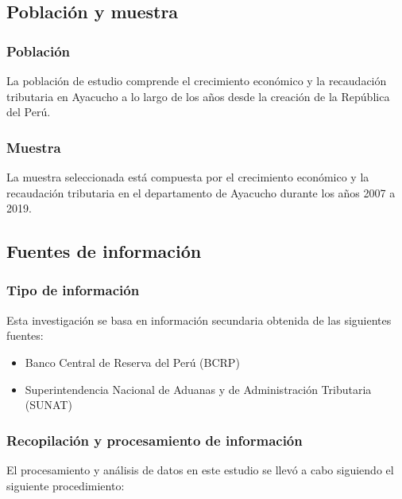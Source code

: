 \documentclass[
  jou,
  floatsintext,
  longtable,
  a4paper,
  nolmodern,
  notxfonts,
  notimes,
  12pt,
  colorlinks=true,linkcolor=blue,citecolor=blue,urlcolor=blue]{apa7}
\begin{document}
\subsection{Población y muestra}\label{sec-poblaciuxf3n-y-muestra}

\subsubsection{Población}\label{poblaciuxf3n}

La población de estudio comprende el crecimiento económico y la
recaudación tributaria en Ayacucho a lo largo de los años desde la
creación de la República del Perú.

\subsubsection{Muestra}\label{muestra}

La muestra seleccionada está compuesta por el crecimiento económico y la
recaudación tributaria en el departamento de Ayacucho durante los años
2007 a 2019.

\subsection{Fuentes de información}\label{sec-fuentes-de-informaciuxf3n}

\subsubsection{Tipo de información}\label{tipo-de-informaciuxf3n}

Esta investigación se basa en información secundaria obtenida de las
siguientes fuentes:

\begin{itemize}
\item
  Banco Central de Reserva del Perú (BCRP)
\item
  Superintendencia Nacional de Aduanas y de Administración Tributaria
  (SUNAT)
\end{itemize}

\subsubsection{Recopilación y procesamiento de
información}\label{recopilaciuxf3n-y-procesamiento-de-informaciuxf3n}

El procesamiento y análisis de datos en este estudio se llevó a cabo
siguiendo el siguiente procedimiento:
\end{document}
